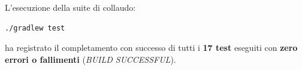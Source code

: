 L'esecuzione della suite di collaudo:
\begin{lstlisting}[language=bash]
./gradlew test
\end{lstlisting}
ha registrato il completamento con successo di tutti i \textbf{17 test} eseguiti con \textbf{zero errori o fallimenti} (\textit{BUILD SUCCESSFUL}).
